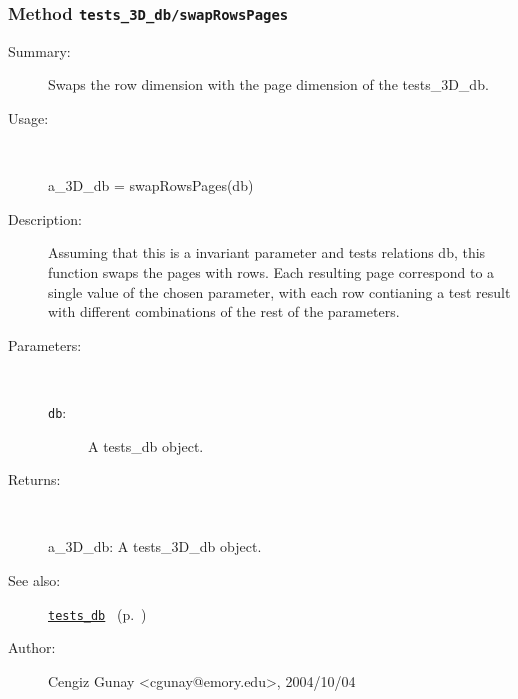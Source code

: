 \subsubsection[Method \texttt{swapRowsPages}]{Method \texttt{tests\_3D\_db/swapRowsPages}}%
%
\label{ref_tests_3D_db__swapRowsPages}%
\hypertarget{ref_tests_3D_db__swapRowsPages}{}%
\begin{description}
\item[Summary:]Swaps the row dimension with the page dimension of the
		  tests\_3D\_db.
%
\item[Usage:]~%
\begin{lyxcode}%
a\_3D\_db = swapRowsPages(db)
%
\end{lyxcode}%
%
\item[Description:]%
Assuming that this is a invariant parameter and tests relations db, 
 this function swaps the pages with rows. Each resulting page correspond
 to a single value of the chosen parameter, with each row contianing a 
 test result with different combinations of the rest of the parameters.
\item[Parameters:]~
\begin{description}%
\item[\texttt{db}:]
 A tests\_db object.
\end{description}%
%
\item[Returns:]~

	a\_3D\_db: A tests\_3D\_db object.
%
%
\item[See also:]%
\hyperlink{ref_tests_db}{\texttt{tests\_db}}%
\ (p.~\pageref{ref_tests_db})%
%
%
\item[Author:]%
Cengiz Gunay <cgunay@emory.edu>, 2004/10/04%
\end{description}
\methodline%
